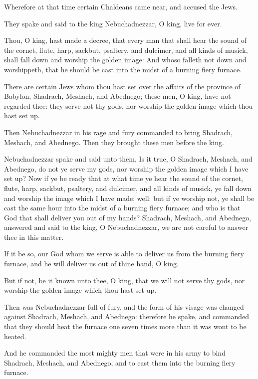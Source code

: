 \verse Wherefore at that time certain Chaldeans came near, and accused the Jews.

\verse They spake and said to the king Nebuchadnezzar, O king, live for ever.

\verse Thou, O king, hast made a decree, that every man that shall hear the sound of the cornet, flute, harp, sackbut, psaltery, and dulcimer, and all kinds of musick, shall fall down and worship the golden image: \verse And whoso falleth not down and worshippeth, that he should be cast into the midst of a burning fiery furnace.

\verse There are certain Jews whom thou hast set over the affairs of the province of Babylon, Shadrach, Meshach, and Abednego; these men, O king, have not regarded thee: they serve not thy gods, nor worship the golden image which thou hast set up.

\verse Then Nebuchadnezzar in his rage and fury commanded to bring Shadrach, Meshach, and Abednego. Then they brought these men before the king.

\verse Nebuchadnezzar spake and said unto them, Is it true, O Shadrach, Meshach, and Abednego, do not ye serve my gods, nor worship the golden image which I have set up?  \verse Now if ye be ready that at what time ye hear the sound of the cornet, flute, harp, sackbut, psaltery, and dulcimer, and all kinds of musick, ye fall down and worship the image which I have made; well: but if ye worship not, ye shall be cast the same hour into the midst of a burning fiery furnace; and who is that God that shall deliver you out of my hands?  \verse Shadrach, Meshach, and Abednego, answered and said to the king, O Nebuchadnezzar, we are not careful to answer thee in this matter.

\verse If it be so, our God whom we serve is able to deliver us from the burning fiery furnace, and he will deliver us out of thine hand, O king.

\verse But if not, be it known unto thee, O king, that we will not serve thy gods, nor worship the golden image which thou hast set up.

\verse Then was Nebuchadnezzar full of fury, and the form of his visage was changed against Shadrach, Meshach, and Abednego: therefore he spake, and commanded that they should heat the furnace one seven times more than it was wont to be heated.

\verse And he commanded the most mighty men that were in his army to bind Shadrach, Meshach, and Abednego, and to cast them into the burning fiery furnace.


